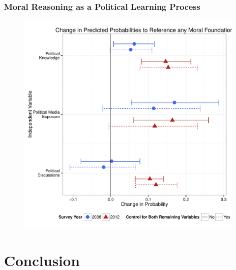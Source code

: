 \documentclass{beamer}
\begin{document}
\subsection{}
\begin{frame}%
  \frametitle{Moral Reasoning as a Political Learning Process}
  \begin{figure}[ht]\centering
    \includegraphics[height=.9\textheight]{../calc/fig/m3_learn}
  \end{figure}
\end{frame}

\section{Conclusion}
\end{document}
